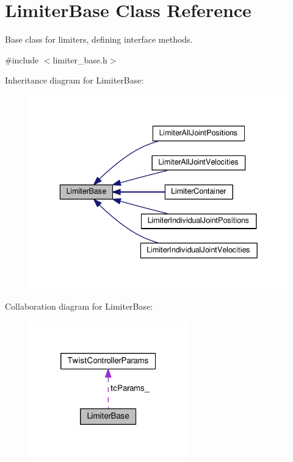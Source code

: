 \hypertarget{classLimiterBase}{\section{Limiter\-Base Class Reference}
\label{classLimiterBase}
}


Base class for limiters, defining interface methods.  




{\ttfamily \#include $<$limiter\-\_\-base.\-h$>$}



Inheritance diagram for Limiter\-Base\-:
\nopagebreak
\begin{figure}[H]
\begin{center}
\leavevmode
\includegraphics[width=336pt]{classLimiterBase__inherit__graph}
\end{center}
\end{figure}


Collaboration diagram for Limiter\-Base\-:
\nopagebreak
\begin{figure}[H]
\begin{center}
\leavevmode
\includegraphics[width=194pt]{classLimiterBase__coll__graph}
\end{center}
\end{figure}
